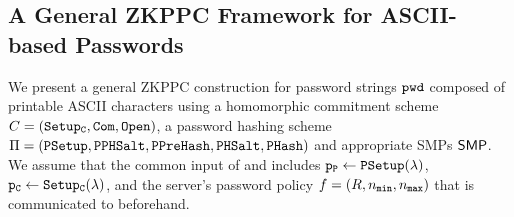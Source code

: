 
\subsection{A General ZKPPC Framework for ASCII-based Passwords} \label{sec:genconstruction}
We present a general \ac{ZKPPC} construction for password strings $\mathtt{pwd}$ composed of printable \ac{ASCII} characters using a homomorphic commitment scheme $C=(\mathtt{Setup_C},\mathtt{Com},\mathtt{Open})$, a password hashing scheme $\Pi=(\mathtt{PSetup},\mathtt{PPHSalt},\allowbreak\mathtt{PPreHash},\allowbreak\mathtt{PHSalt},\allowbreak\mathtt{PHash})$ and appropriate \acp{SMP} $\mathsf{SMP}$. 
We assume that the common input of \Client and \Server includes $\mathtt{p_P}\gets\mathtt{PSetup}(\lambda)$, $\mathtt{p_C}\gets\mathtt{Setup_C}(\lambda)$, and the server's password policy $f=(R, {n_\mathtt{min}}, {n_\mathtt{max}})$ that is communicated to \Client beforehand.

